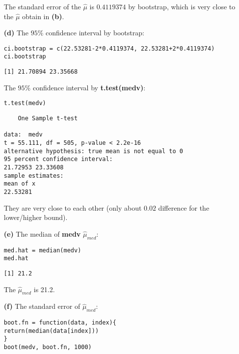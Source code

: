 \documentclass[twoside,11pt]{homework}
\begin{document}
\begin{enumerate}
\begin{verbatim}
\end{verbatim}

The standard error of the $\hat{\mu}$ is $0.4119374$ by bootstrap, which is very close to the $\hat{\mu}$ obtain in \textbf{(b)}.

\item[\textbf{(d)}] The $95\%$ confidence interval by bootstrap:

\begin{lstlisting}
ci.bootstrap = c(22.53281-2*0.4119374, 22.53281+2*0.4119374)
ci.bootstrap
\end{lstlisting}

\begin{verbatim}
[1] 21.70894 23.35668

\end{verbatim}

The $95\%$ confidence interval by \textbf{t.test(medv)}:

\begin{lstlisting}
t.test(medv)
\end{lstlisting}

\begin{verbatim}
	One Sample t-test

data:  medv
t = 55.111, df = 505, p-value < 2.2e-16
alternative hypothesis: true mean is not equal to 0
95 percent confidence interval:
21.72953 23.33608
sample estimates:
mean of x 
22.53281

\end{verbatim}

They are very close to each other (only about $0.02$ difference for the lower/higher bound).

\item[\textbf{(e)}] The median of \textbf{medv} $\hat{\mu}_{med}$:

\begin{lstlisting}
med.hat = median(medv)
med.hat
\end{lstlisting}

\begin{verbatim}
[1] 21.2

\end{verbatim}

The $\hat{\mu}_{med}$ is 21.2.

\item[\textbf{(f)}] The standard error of $\hat{\mu}_{med}$:

\begin{lstlisting}
boot.fn = function(data, index){
return(median(data[index]))
}
boot(medv, boot.fn, 1000)
\end{lstlisting}


\end{enumerate}
\end{document}
